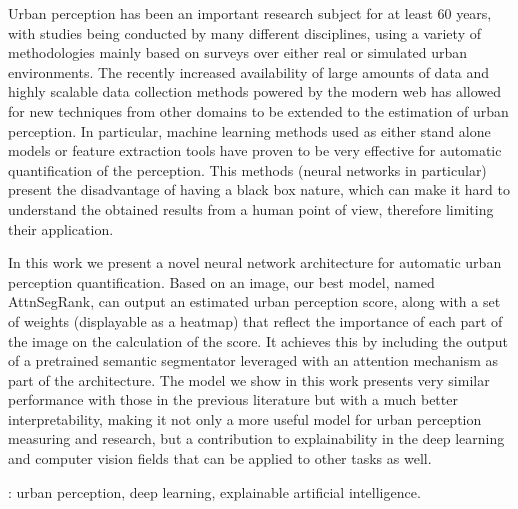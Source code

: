 Urban perception has been an important research subject for at least 60 years, with studies
being conducted by many different disciplines, using a variety of methodologies mainly based
on surveys over either real or simulated urban environments. The recently increased availability
of large amounts of data and highly scalable data collection methods powered by the modern web
has allowed for new techniques from other domains to be extended to the estimation of urban perception.
In particular, machine learning methods used as either stand alone models or feature extraction tools
have proven to be very effective for automatic quantification of the perception. This methods
(neural networks in particular) present the disadvantage of having a black box
nature, which can make it hard to understand the obtained results from a human point of view,
therefore limiting their application.

In this work we present a novel neural network architecture for automatic urban perception quantification.
Based on an image, our best model, named AttnSegRank, can output an estimated urban perception score,
along with a set of weights (displayable as a heatmap) that reflect the importance of each part of the image
on the calculation of the score. It achieves this by including the output of a pretrained
semantic segmentator leveraged with an attention mechanism as part of the architecture. The model
we show in this work presents very similar performance with those in the previous literature but
with a much better interpretability, making it  not only a more useful model for urban perception
measuring and research, but a contribution to explainability in
the deep learning and computer vision fields that can be applied to other tasks as well.


\vfill
{}:  urban perception, deep learning, explainable artificial intelligence.
